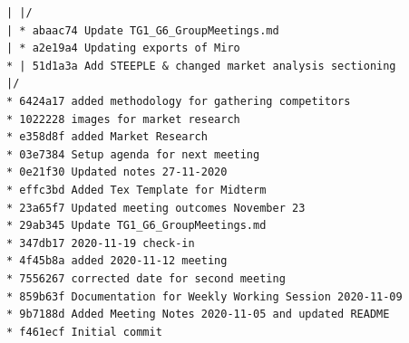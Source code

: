 \begin{verbatim}
| |/
| * abaac74 Update TG1_G6_GroupMeetings.md
| * a2e19a4 Updating exports of Miro
* | 51d1a3a Add STEEPLE & changed market analysis sectioning
|/
* 6424a17 added methodology for gathering competitors
* 1022228 images for market research
* e358d8f added Market Research
* 03e7384 Setup agenda for next meeting
* 0e21f30 Updated notes 27-11-2020
* effc3bd Added Tex Template for Midterm
* 23a65f7 Updated meeting outcomes November 23
* 29ab345 Update TG1_G6_GroupMeetings.md
* 347db17 2020-11-19 check-in
* 4f45b8a added 2020-11-12 meeting
* 7556267 corrected date for second meeting
* 859b63f Documentation for Weekly Working Session 2020-11-09
* 9b7188d Added Meeting Notes 2020-11-05 and updated README
* f461ecf Initial commit
\end{verbatim}


